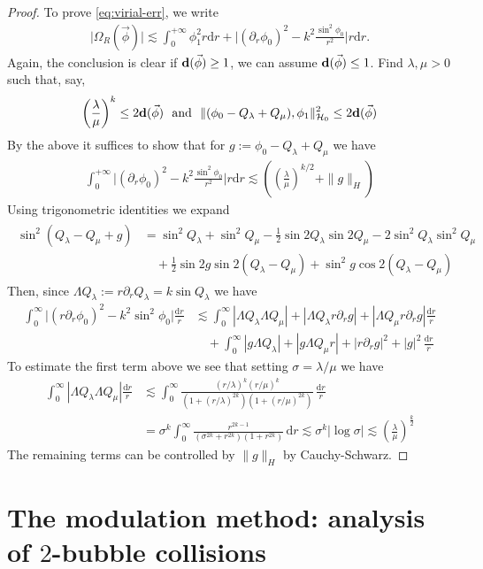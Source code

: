 \documentclass[10pt,reqno]{amsart}
\newcommand{\HH}{\mathcal{H}}
\newcommand{\la}{\lambda}
\newcommand{\s}{\sigma}
\newcommand{\La}{\Lambda}
\newcommand{\p}{\partial}
\newcommand{\abs}[1]{\left\lvert{#1}\right\rvert}
\newcommand{\ant}[1]{\begin{align*}\begin{split} #1 \end{split}\end{align*}}
\newcommand{\EQ}[1]{\begin{equation}\begin{split} #1 \end{split}\end{equation}}
\numberwithin{equation}{section}
\theoremstyle{remark}
\newcommand{\mand}{{\ \ \text{and} \ \  }}
\newcommand{\ud}{\mathrm{d}}
\newcommand{\0}{\emptyset}
\newcommand{\bfd}{{\bf d}}
\begin{document}
\begin{proof}
To prove \eqref{eq:virial-err}, we write
 \EQ{
   \big|\Omega_R(\vec\phi)\big| \lesssim \int_0^{+\infty}\phi_1^2r\ud r + \Big|(\partial_r \phi_0)^2 - k^2\frac{\sin^2\phi_0}{r^2}\Big|r\ud r.
 }
 Again, the conclusion is clear if $\bfd(\vec\phi) \geq 1$, we can assume $\bfd(\vec\phi) \leq 1$.  Find $\la, \mu>0$ such that, say, 
 \EQ{
 \left( \frac{\la}{\mu} \right)^k  \le 2\bfd( \vec \phi) \mand \| (\phi_0 - Q_\la + Q_\mu), \phi_1 \|_{\HH_0}^2  \le 2\bfd(\vec \phi)
 } 
 By the above it suffices to show that for $g:= \phi_0 - Q_\la + Q_\mu$ we have 
 \EQ{
 \int_0^{+\infty} \Big|(\partial_r \phi_0)^2 - k^2\frac{\sin^2\phi_0}{r^2}\Big|r\ud r   \lesssim  \left( \left( \frac{\la}{\mu} \right)^{k/2} + \| g \|_{H} \right)
 }
 Using trigonometric identities we expand 
  \ant{
 \sin^2( Q_\la - Q_\mu + g)  & =     \sin^2 Q_\la + \sin^2 Q_\mu  - \frac{1}{2} \sin2Q_\la \sin2 Q_\mu - 2 \sin ^2Q_\la \sin^2 Q_\mu \\
 & \quad +\frac{1}{2} \sin 2g \sin 2(Q_\la - Q_\mu) + \sin^2 g \cos2(Q_\la - Q_\mu) 
 }
Then, since $\La Q_{\la}:= r \p_r Q_\la  = k \sin Q_\la$ we have 
 \EQ{
 \int_0^\infty \Big|(r\partial_r \phi_0)^2 - k^2\sin^2\phi_0\Big|  \frac{\ud r}{r} &\lesssim  \int_0^\infty   \abs{ \La Q_\la \La Q_\mu} + \abs{ \La Q_\la  r\p_r g} + \abs{ \La Q_\mu r\p_r g}  \frac{\ud r}{r}\\
  & \quad + \int_0^\infty \abs{ g \La Q_\la  } + \abs{ g \La Q_\mu r } + \abs{r \p_r g}^2+ \abs{g}^2 \, \frac{\ud r}{r}
 }
 To estimate the first term above we see that setting $\s = \la/ \mu$ we have 
 \EQ{
 \int_0^\infty   \abs{ \La Q_\la \La Q_\mu} \frac{\ud r}{r}  &\lesssim  \int_0^\infty  \frac{(r/\la)^k (r/\mu)^k}{ (1+ (r/\la)^{2k})(1+ (r/\mu)^{2k})} \, \frac{\ud r }{r} \\
 &= \s^{k} \int_0^\infty\frac{r^{2k-1}}{ (\s^{2k} + r^{2k})( 1+ r^{2k})} \, \ud r \lesssim \s^{k} \abs{\log \s} \lesssim \left(\frac{\la}{\mu}\right)^{\frac{k}{2}}
 }
The remaining terms can be controlled by $\| g \|_H$ by Cauchy-Schwarz. 
  \end{proof}
 


 

\section{The modulation method:  analysis of $2$-bubble collisions} \label{s:mod} 
\end{document}

